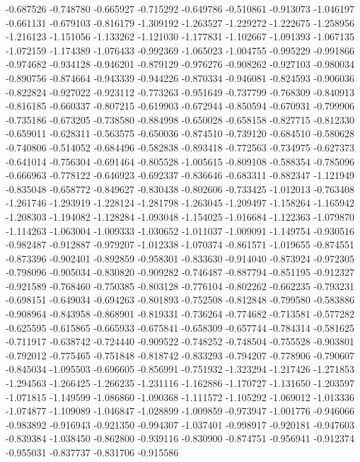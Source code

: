 -0.687526
-0.748780
-0.665927
-0.715292
-0.649786
-0.510861
-0.913073
-1.046197
-0.661131
-0.679103
-0.816179
-1.309192
-1.263527
-1.229272
-1.222675
-1.258956
-1.216123
-1.151056
-1.133262
-1.121030
-1.177831
-1.102667
-1.091393
-1.067135
-1.072159
-1.174389
-1.076433
-0.992369
-1.065023
-1.004755
-0.995229
-0.991866
-0.974682
-0.934128
-0.946201
-0.879129
-0.976276
-0.908262
-0.927103
-0.980034
-0.890756
-0.874664
-0.943339
-0.944226
-0.870334
-0.946081
-0.824593
-0.906036
-0.822824
-0.927022
-0.923112
-0.773263
-0.951649
-0.737799
-0.768309
-0.840913
-0.816185
-0.660337
-0.807215
-0.619903
-0.672944
-0.850594
-0.670931
-0.799906
-0.735186
-0.673205
-0.738580
-0.884998
-0.650028
-0.658158
-0.827715
-0.812330
-0.659011
-0.628311
-0.563575
-0.650036
-0.874510
-0.739120
-0.684510
-0.580628
-0.740806
-0.514052
-0.684496
-0.582838
-0.893418
-0.772563
-0.734975
-0.627373
-0.641014
-0.756304
-0.691464
-0.805528
-1.005615
-0.809108
-0.588354
-0.785096
-0.666963
-0.778122
-0.646923
-0.692337
-0.836646
-0.683311
-0.882347
-1.121949
-0.835048
-0.658772
-0.849627
-0.830438
-0.802606
-0.733425
-1.012013
-0.763408
-1.261746
-1.293919
-1.228124
-1.281798
-1.263045
-1.209497
-1.158264
-1.165942
-1.208303
-1.194082
-1.128284
-1.093048
-1.154025
-1.016684
-1.122363
-1.079870
-1.114263
-1.063004
-1.009333
-1.030652
-1.011037
-1.009091
-1.149754
-0.930516
-0.982487
-0.912887
-0.979207
-1.012338
-1.070374
-0.861571
-1.019655
-0.874551
-0.873396
-0.902401
-0.892859
-0.958301
-0.833630
-0.914040
-0.873924
-0.972305
-0.798096
-0.905034
-0.830820
-0.909282
-0.746487
-0.887794
-0.851195
-0.912327
-0.921589
-0.768460
-0.750385
-0.803128
-0.776104
-0.802262
-0.662235
-0.793231
-0.698151
-0.649034
-0.694263
-0.801893
-0.752508
-0.812848
-0.799580
-0.583886
-0.908964
-0.843958
-0.868901
-0.819331
-0.736264
-0.774682
-0.713581
-0.577282
-0.625595
-0.615865
-0.665933
-0.675841
-0.658309
-0.657744
-0.784314
-0.581625
-0.711917
-0.638742
-0.724440
-0.909522
-0.748252
-0.748504
-0.755528
-0.903801
-0.792012
-0.775465
-0.751848
-0.818742
-0.833293
-0.794207
-0.778906
-0.790607
-0.845034
-1.095503
-0.696605
-0.856991
-0.751932
-1.323294
-1.217426
-1.271853
-1.294563
-1.266425
-1.266235
-1.231116
-1.162886
-1.170727
-1.131650
-1.203597
-1.071815
-1.149599
-1.086860
-1.090368
-1.111572
-1.105292
-1.069012
-1.013336
-1.074877
-1.109089
-1.046847
-1.028899
-1.009859
-0.973947
-1.001776
-0.946066
-0.983892
-0.916943
-0.921350
-0.994307
-1.037401
-0.998917
-0.920181
-0.947603
-0.839384
-1.038450
-0.862800
-0.939116
-0.830900
-0.874751
-0.956941
-0.912374
-0.955031
-0.837737
-0.831706
-0.915586
